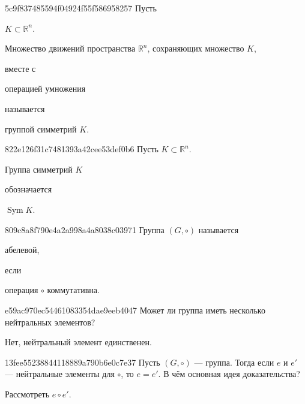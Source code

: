 \begin{note}{5c9f837485594f04924f55f586958257}
    Пусть \begin{icloze}{4}\({ K \subset \mathbb R^{n} }\).\end{icloze}
    \begin{icloze}{2}Множество движений пространства \({ \mathbb R^{n} }\), сохраняющих множество \({ K }\),\end{icloze} вместе с \begin{icloze}{3}операцией умножения\end{icloze} называется \begin{icloze}{1}группой симметрий \({ K }\).\end{icloze}
\end{note}

\begin{note}{822e126f31c7481393a42cee53def0b6}
    Пусть \({ K \subset \mathbb R^{n} }\).
    \begin{icloze}{2}Группа симметрий \({ K }\)\end{icloze} обозначается \begin{icloze}{1}\({ \operatorname{Sym} K }\).\end{icloze}
\end{note}

\begin{note}{809c8a8f790e4a2a998a4a8038c03971}
    Группа \({ (G, \circ) }\) называется \begin{icloze}{2}абелевой,\end{icloze} если \begin{icloze}{1}операция \({ \circ }\) коммутативна.\end{icloze}
\end{note}

\begin{note}{e59ac970ec54461083354dae9eeb4047}
    Может ли группа иметь несколько нейтральных элементов?

    \begin{cloze}{1}
        Нет, нейтральный элемент единственен.
    \end{cloze}
\end{note}

\begin{note}{13fee55238844118889a790b6e0c7e37}
    Пусть \({ (G, \circ) }\) --- группа.
    Тогда если \({ e }\) и \({ e' }\) --- нейтральные элементы для \({ \circ }\), то \({ e = e' }\). В чём основная идея доказательства?

    \begin{cloze}{1}
        Рассмотреть \({ e \circ e' }\).
    \end{cloze}
\end{note}


